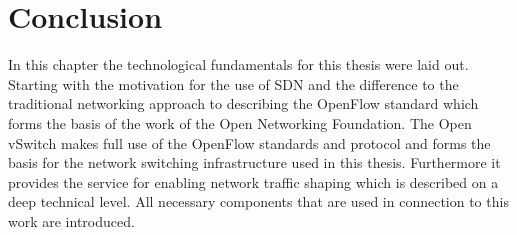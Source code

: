 %
%


\section{Conclusion}

In this chapter the technological fundamentals for this thesis were laid out. Starting with the motivation for the use of SDN and the difference to the traditional networking approach to describing the OpenFlow standard which forms the basis of the work of the Open Networking Foundation. The Open vSwitch makes full use of the OpenFlow standards and protocol and forms the basis for the network switching infrastructure used in this thesis. Furthermore it provides the service for enabling network traffic shaping which is described on a deep technical level. All necessary components that are used in connection to this work are introduced.
